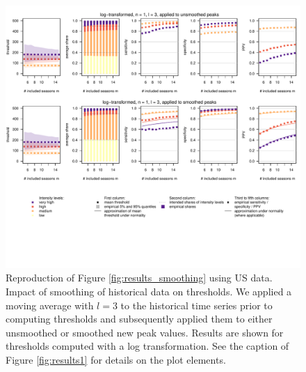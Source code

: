 \documentclass{article}
\begin{document}
\begin{figure}[h!]
\centering
\includegraphics[width=1\textwidth]{figure/plot_smoothing3_us_small.pdf}
\vspace{-33mm}

\caption{Reproduction of Figure \ref{fig:results_smoothing} using US data. Impact of smoothing of historical data on thresholds. We applied a moving average with $l = 3$ to the historical time series prior to computing thresholds and subsequently applied them to either unsmoothed or smoothed new peak values. Results are shown for thresholds computed with a log transformation. See the caption of Figure \ref{fig:results1} for details on the plot elements.}
\label{fig:results_smoothing_us}
\end{figure}
\end{document}
